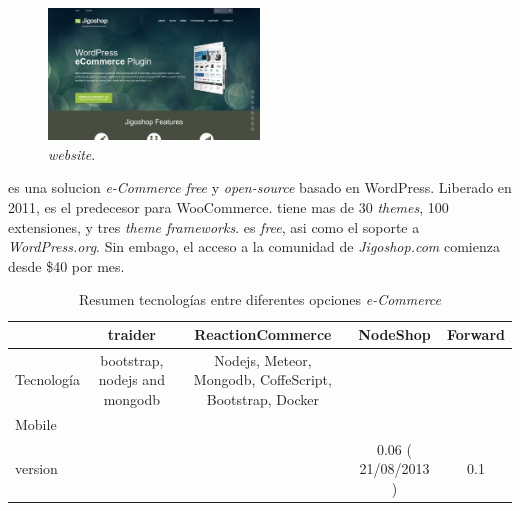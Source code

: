 \subsection{\nameJigoshop}

\begin{figure}[h!]
	\centering
	\includegraphics[width=0.5\textwidth]{figuras/cap1/JigoshopWebsite.jpg}
	\caption{\nameJigoshop \textit{website}\cite{online_Jigoshop}.}
\end{figure}

\nameJigoshop es una solucion \textit{e-Commerce} \textit{free} y \textit{open-source} basado en WordPress. Liberado en 2011, \nameJigoshop es el predecesor para WooCommerce. \nameJigoshop tiene mas de 30   \textit{themes}, 100 extensiones, y tres \textit{theme frameworks}. \nameJigoshop es  \textit{free}, asi como el soporte a \textit{WordPress.org}. Sin embago, el acceso a la comunidad de \textit{Jigoshop.com} comienza desde \$40 por mes.

\begin{table}[h!]
    \tiny
   
\begin{tabular}{ |l|c|c|c|c| }
\hline
	&
	traider\cite{online_Traider}&
	ReactionCommerce\cite{online_reactionCommerce}&
	NodeShop\cite{online_NodeShop}&
	Forward\cite{online_Forward}
 
\\ \hline
	Tecnología &
	bootstrap, nodejs and mongodb &
	Nodejs, Meteor, Mongodb, CoffeScript, Bootstrap, Docker&
	&
	

\\ \hline
	Mobile &
	&
	&
	&
\\ \hline
	version &
	&
	&
	0.06 ( 21/08/2013 )&
	0.1

\\ \hline
\end{tabular}
    \caption{ Resumen tecnologías entre diferentes opciones \textit{e-Commerce}}
    \label{tab:resume_technology_ecommerce}
\end{table}

